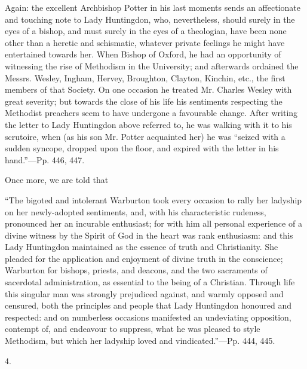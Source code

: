 Again: the excellent Archbishop Potter in his
last moments sends an affectionate and touching note to Lady
Huntingdon, who, nevertheless, should surely in the eyes of a bishop,
and must surely in the eyes of a theologian, have been none other than
a heretic and schismatic, whatever private feelings he might have
entertained towards her. When Bishop of Oxford, he had an opportunity of witnessing the rise of Methodism in the University; and
afterwards ordained the Messrs. Wesley, Ingham, Hervey, Broughton,
Clayton, Kinchin, etc., the first members of that Society. On one
occasion he treated Mr. Charles Wesley with great severity; but
towards the close of his life his sentiments respecting the Methodist
preachers seem to have undergone a favourable change. After writing
the letter to Lady Huntingdon above referred to, he was walking with
it to his scrutoire, when (as his son Mr. Potter acquainted her) he
was ``seized with a sudden syncope, dropped upon the floor, and expired
with the letter in his hand.''—Pp. 446, 447.

Once more, we are told that

``The
bigoted and intolerant Warburton took every occasion to rally her
ladyship on her newly-adopted sentiments, and, with his characteristic
rudeness, pronounced her an incurable enthusiast; for with him all
personal experience of a divine witness by the Spirit of God in the
heart was rank enthusiasm: and this Lady Huntingdon maintained as the
essence of truth and Christianity. She pleaded for the application and
enjoyment of divine truth in the conscience; Warburton for bishops,
priests, and deacons, and the two sacraments of sacerdotal
administration, as essential to the being of a Christian. Through life
this singular man was strongly prejudiced against, and warmly opposed
and censured, both the principles and people that Lady Huntingdon
honoured and respected: and on numberless occasions manifested an
undeviating opposition, contempt of, and endeavour to suppress, what
he was pleased to style Methodism, but which her ladyship loved and
vindicated.''—Pp. 444, 445.

4.

